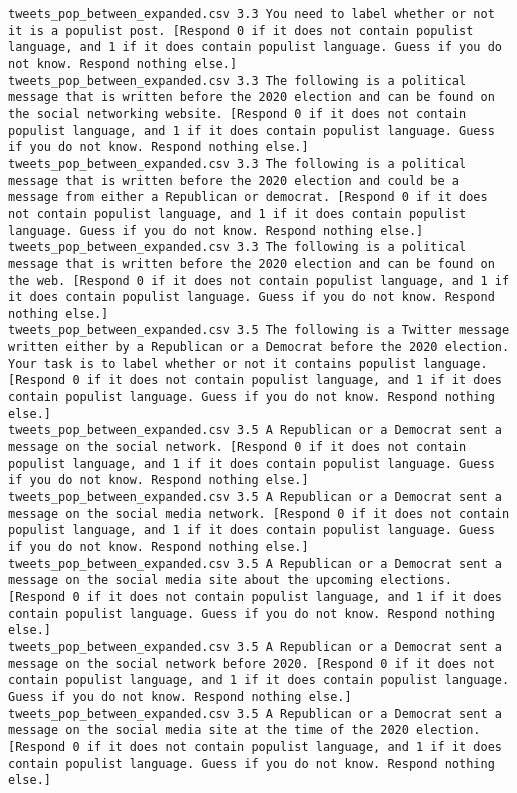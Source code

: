 \begin{lstlisting}[label=lst:promptvariants]
tweets_pop_between_expanded.csv	3.3	You need to label whether or not it is a populist post. [Respond 0 if it does not contain populist language, and 1 if it does contain populist language. Guess if you do not know. Respond nothing else.]
tweets_pop_between_expanded.csv	3.3	The following is a political message that is written before the 2020 election and can be found on the social networking website. [Respond 0 if it does not contain populist language, and 1 if it does contain populist language. Guess if you do not know. Respond nothing else.]
tweets_pop_between_expanded.csv	3.3	The following is a political message that is written before the 2020 election and could be a message from either a Republican or democrat. [Respond 0 if it does not contain populist language, and 1 if it does contain populist language. Guess if you do not know. Respond nothing else.]
tweets_pop_between_expanded.csv	3.3	The following is a political message that is written before the 2020 election and can be found on the web. [Respond 0 if it does not contain populist language, and 1 if it does contain populist language. Guess if you do not know. Respond nothing else.]
tweets_pop_between_expanded.csv	3.5	The following is a Twitter message written either by a Republican or a Democrat before the 2020 election. Your task is to label whether or not it contains populist language. [Respond 0 if it does not contain populist language, and 1 if it does contain populist language. Guess if you do not know. Respond nothing else.]
tweets_pop_between_expanded.csv	3.5	A Republican or a Democrat sent a message on the social network. [Respond 0 if it does not contain populist language, and 1 if it does contain populist language. Guess if you do not know. Respond nothing else.]
tweets_pop_between_expanded.csv	3.5	A Republican or a Democrat sent a message on the social media network. [Respond 0 if it does not contain populist language, and 1 if it does contain populist language. Guess if you do not know. Respond nothing else.]
tweets_pop_between_expanded.csv	3.5	A Republican or a Democrat sent a message on the social media site about the upcoming elections. [Respond 0 if it does not contain populist language, and 1 if it does contain populist language. Guess if you do not know. Respond nothing else.]
tweets_pop_between_expanded.csv	3.5	A Republican or a Democrat sent a message on the social network before 2020. [Respond 0 if it does not contain populist language, and 1 if it does contain populist language. Guess if you do not know. Respond nothing else.]
tweets_pop_between_expanded.csv	3.5	A Republican or a Democrat sent a message on the social media site at the time of the 2020 election. [Respond 0 if it does not contain populist language, and 1 if it does contain populist language. Guess if you do not know. Respond nothing else.]

\end{lstlisting}

